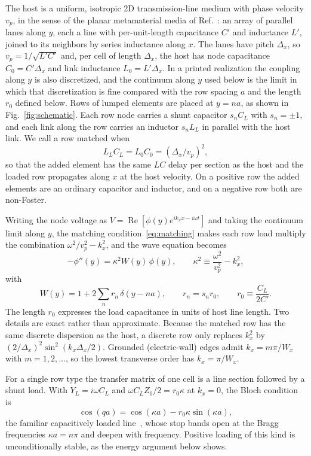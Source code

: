 \documentclass[aps,prapplied,twocolumn,superscriptaddress,floatfix,longbibliography]{revtex4-2}
\begin{document}
The host is a uniform, isotropic 2D transmission-line medium with phase velocity $v_p$, in the sense of the planar metamaterial media of Ref.~\cite{Eleftheriades_2002:TMTT}: an array of parallel lanes along $y$, each a line with per-unit-length capacitance $C'$ and inductance $L'$, joined to its neighbors by series inductance along $x$. The lanes have pitch $\Delta_x$, so $v_p=1/\sqrt{L'C'}$ and, per cell of length $\Delta_x$, the host has node capacitance $C_0=C'\Delta_x$ and link inductance $L_0=L'\Delta_x$. In a printed realization the coupling along $y$ is also discretized, and the continuum along $y$ used below is the limit in which that discretization is fine compared with the row spacing $a$ and the length $r_0$ defined below. Rows of lumped elements are placed at $y=na$, as shown in Fig.~\ref{fig:schematic}. Each row node carries a shunt capacitor $s_nC_L$ with $s_n=\pm1$, and each link along the row carries an inductor $s_nL_L$ in parallel with the host link. We call a row matched when
\begin{equation}
L_LC_L=L_0C_0=(\Delta_x/v_p)^2,
\label{eq:matching}
\end{equation}
so that the added element has the same $LC$ delay per section as the host and the loaded row propagates along $x$ at the host velocity. On a positive row the added elements are an ordinary capacitor and inductor, and on a negative row both are non-Foster.

Writing the node voltage as $V=\operatorname{Re}[\phi(y)e^{ik_xx-i\omega t}]$ and taking the continuum limit along $y$, the matching condition~\eqref{eq:matching} makes each row load multiply the combination $\omega^2/v_p^2-k_x^2$, and the wave equation becomes
\begin{equation}
-\phi''(y)=\kappa^2W(y)\,\phi(y),\qquad
\kappa^2\equiv\frac{\omega^2}{v_p^2}-k_x^2,
\label{eq:gevp}
\end{equation}
with
\begin{equation}
W(y)=1+2\sum_n r_n\,\delta(y-na),\qquad r_n=s_nr_0,\qquad r_0\equiv\frac{C_L}{2C'} .
\label{eq:W}
\end{equation}
The length $r_0$ expresses the load capacitance in units of host line length. Two details are exact rather than approximate. Because the matched row has the same discrete dispersion as the host, a discrete row only replaces $k_x^2$ by $(2/\Delta_x)^2\sin^2(k_x\Delta_x/2)$. Grounded (electric-wall) edges admit $k_x=m\pi/W_x$ with $m=1,2,\dots$, so the lowest transverse order has $k_x=\pi/W_x$.

For a single row type the transfer matrix of one cell is a line section followed by a shunt load. With $Y_L=i\omega C_L$ and $\omega C_LZ_0/2=r_0\kappa$ at $k_x=0$, the Bloch condition is
\begin{equation}
\cos(qa)=\cos(\kappa a)-r_0\kappa\sin(\kappa a),
\label{eq:passive}
\end{equation}
the familiar capacitively loaded line~\cite{Pozar_2012:book}, whose stop bands open at the Bragg frequencies $\kappa a=n\pi$ and deepen with frequency. Positive loading of this kind is unconditionally stable, as the energy argument below shows.
\end{document}
